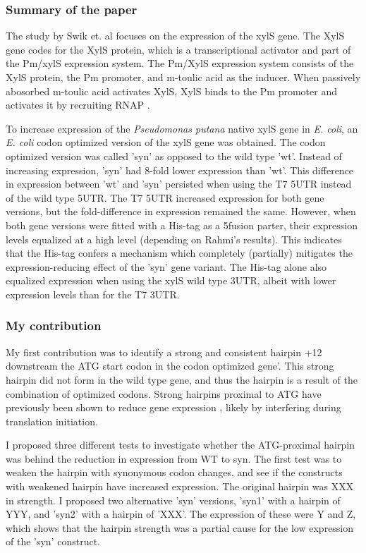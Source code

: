 %

\subsubsection{Summary of the paper}
The study by Swik et. al focuses on the expression of the xylS gene. The XylS
gene codes for the XylS protein, which is a transcriptional activator and part
of the Pm/xylS expression system. The Pm/XylS expression system consists of the
XylS protein, the Pm promoter, and m-toulic acid as the inducer. When passively
abosorbed m-toulic acid activates XylS, XylS binds to the Pm promoter and
activates it by recruiting RNAP \cite{gallegos_arac/xyls_1997,
inouye_expression_1987}.

To increase expression of the \textit{Pseudomonas putana} native xylS gene in
\textit{E. coli}, an \textit{E. coli} codon optimized version of the xylS gene
was obtained. The codon optimized version was called 'syn' as opposed to the
wild type 'wt'. Instead of increasing expression, 'syn' had 8-fold lower
expression than 'wt'. This difference in expression between 'wt' and 'syn'
persisted when using the T7 5\ppp UTR instead of the wild type 5\ppp UTR. The T7
5\ppp UTR increased expression for both gene versions, but the fold-difference in
expression remained the same. However, when both gene versions were fitted with
a His-tag as a 5\ppp fusion parter, their expression levels equalized at a high
level (depending on Rahmi's results). This indicates that the His-tag confers a
mechanism which completely (partially) mitigates the expression-reducing effect
of the 'syn' gene variant. The His-tag alone also equalized expression when
using the xylS wild type 3\ppp UTR, albeit with lower expression levels than for
the T7 3\ppp UTR.

\subsubsection{My contribution}
My first contribution was to identify a strong and consistent hairpin +12
downstream the ATG start codon in the codon optimized gene'. This strong
hairpin did not form in the wild type gene, and thus the hairpin is a result of
the combination of optimized codons. Strong hairpins proximal to ATG have
previously been shown to reduce gene expression \cite{seo_quantitative_2009},
likely by interfering during translation initiation.

I proposed three different tests to investigate whether the ATG-proximal
hairpin was behind the reduction in expression from WT to syn. The first test
was to weaken the hairpin with synonymous codon changes, and see if the
constructs with weakened hairpin have increased expression. The original
hairpin was XXX in strength. I proposed two alternative 'syn' versions, 'syn1'
with a hairpin of YYY, and 'syn2' with a hairpin of 'XXX'. The expression of
these were Y and Z, which shows that the hairpin strength was a partial cause
for the low expression of the 'syn' construct.

